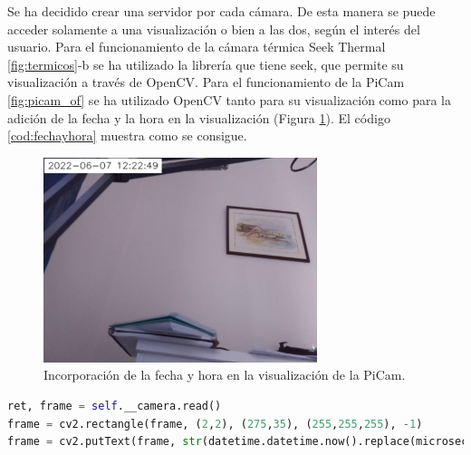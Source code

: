 Se ha decidido crear una servidor por cada cámara. De esta manera se puede acceder solamente a una visualización o bien a las dos, según el interés del usuario. Para el funcionamiento de la cámara térmica Seek Thermal \ref{fig:termicos}-b se ha utilizado la librería que tiene seek, que permite su visualización a través de OpenCV. Para el funcionamiento de la PiCam \ref{fig:picam_of} se ha utilizado OpenCV tanto para su visualización como para la adición de la fecha y la hora en la visualización (Figura \ref{fig:fechayhora}). El código \ref{cod:fechayhora} muestra como se consigue.\\
\begin{figure} [h!]
  \begin{center}
    \includegraphics[width=8cm]{figs/fechayhora}
  \end{center}
  \caption{Incorporación de la fecha y hora en la visualización de la PiCam.}
  \label{fig:fechayhora}
\end{figure}

\begin{code}[h]
\begin{lstlisting}[language=Python]
ret, frame = self.__camera.read()
frame = cv2.rectangle(frame, (2,2), (275,35), (255,255,255), -1)
frame = cv2.putText(frame, str(datetime.datetime.now().replace(microsecond=0)), (10,25), cv2.FONT_HERSEY_SIMPLEX, 0.7, (0,0,0), 1, cv2.LINE_AA))
\end{lstlisting}
\caption[Código para incorporar la fecha en la esquina superior izquierda.]{Código para incorporar la fecha en la esquina superior izquierda.}
\label{cod:fechayhora}
\end{code}

